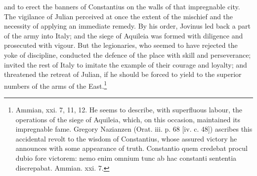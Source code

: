 and to erect the banners of Constantius on the walls of that impregnable city. The vigilance of Julian perceived at once the extent of the mischief and the necessity of applying an immediate remedy. By his order, Jovinus led back a part of the army into Italy; and the siege of Aquileia was formed with diligence and prosecuted with vigour. But the legionaries, who seemed to have rejected the yoke of discipline, conducted the defence of the place with skill and perseverance; invited the rest of Italy to imitate the example of their courage and loyalty; and threatened the retreat of Julian, if he should be forced to yield to the superior numbers of the arms of the East.\footnote{Ammian, xxi. 7, 11, 12. He seems to describe, with superfluous labour, the operations of the siege of Aquileia, which, on this occasion, maintained its impregnable fame. Gregory Nazianzen (Orat. iii. p. 68 [iv. c. 48]) ascribes this accidental revolt to the wisdom of Constantius, whose assured victory he announces with some appearance of truth. Constantio quem credebat procul dubio fore victorem: nemo enim omnium tunc ab hac constanti sententia discrepabat. Ammian. xxi. 7.}

